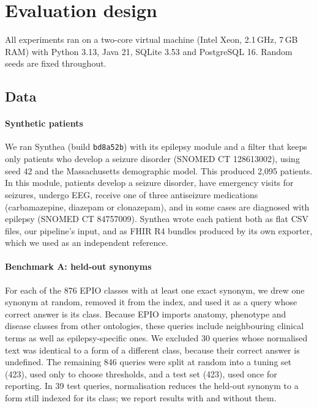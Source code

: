 \documentclass[preprint,12pt]{elsarticle}
\begin{document}
\section{Evaluation design}
\label{sec:eval}

All experiments ran on a two-core virtual machine (Intel Xeon, 2.1\,GHz, 7\,GB RAM) with Python 3.13, Java 21, SQLite 3.53 and PostgreSQL 16. Random seeds are fixed throughout.

\subsection{Data}
\paragraph{Synthetic patients} We ran Synthea \cite{walonoski2018} (build \texttt{bd8a52b}) with its epilepsy module and a filter that keeps only patients who develop a seizure disorder (SNOMED CT 128613002), using seed 42 and the Massachusetts demographic model. This produced 2,095 patients. In this module, patients develop a seizure disorder, have emergency visits for seizures, undergo EEG, receive one of three antiseizure medications (carbamazepine, diazepam or clonazepam), and in some cases are diagnosed with epilepsy (SNOMED CT 84757009). Synthea wrote each patient both as flat CSV files, our pipeline's input, and as FHIR R4 bundles produced by its own exporter, which we used as an independent reference.

\paragraph{Benchmark A: held-out synonyms} For each of the 876 EPIO classes with at least one exact synonym, we drew one synonym at random, removed it from the index, and used it as a query whose correct answer is its class. Because EPIO imports anatomy, phenotype and disease classes from other ontologies, these queries include neighbouring clinical terms as well as epilepsy-specific ones. We excluded 30 queries whose normalised text was identical to a form of a different class, because their correct answer is undefined. The remaining 846 queries were split at random into a tuning set (423), used only to choose thresholds, and a test set (423), used once for reporting. In 39 test queries, normalisation reduces the held-out synonym to a form still indexed for its class; we report results with and without them.
\end{document}
